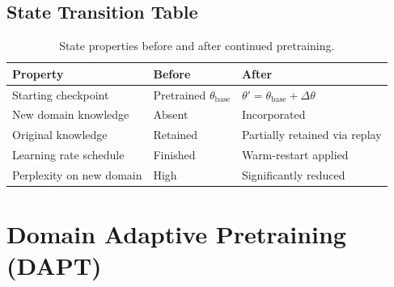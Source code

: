 \subsection{State Transition Table}
\begin{table}[h]\centering
\begin{tabular}{lll}\toprule
\textbf{Property} & \textbf{Before} & \textbf{After}\\\midrule
Starting checkpoint & Pretrained $\theta_{\text{base}}$ & $\theta' = \theta_{\text{base}} + \Delta\theta$\\
New domain knowledge & Absent & Incorporated\\
Original knowledge & Retained & Partially retained via replay\\
Learning rate schedule & Finished & Warm-restart applied\\
Perplexity on new domain & High & Significantly reduced\\\bottomrule
\end{tabular}
\caption{State properties before and after continued pretraining.}
\end{table}

\newpage
\section{Domain Adaptive Pretraining (DAPT)}

